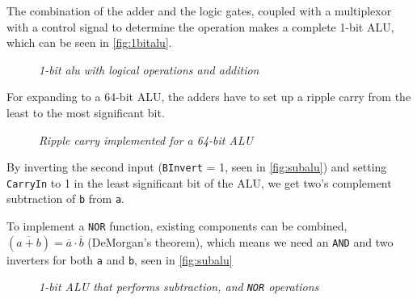 \documentclass[11pt]{article}
\begin{document}
The combination of the adder and the logic gates, coupled with a multiplexor with a control signal to determine the operation makes a complete 1-bit ALU, which can be seen in \autoref{fig:1bitalu}.
\pagebreak

\begin{figure}[htbp]
    \centering
    \caption{\textit{1-bit alu with logical operations and addition}}
    \label{fig:1bitalu}
\end{figure}

For expanding to a 64-bit ALU, the adders have to set up a ripple carry from the least to the most significant bit.

\begin{figure}[htbp]
    \centering
    \caption{\textit{Ripple carry implemented for a 64-bit ALU}}
\end{figure}

By inverting the second input (\texttt{BInvert} = 1, seen in \autoref{fig:subalu}) and setting \texttt{CarryIn} to 1 in the least significant bit of the ALU, we get two’s complement subtraction of \texttt{b} from \texttt{a}.

To implement a \texttt{NOR} function, existing components can be combined, $(\overline{a+b})=\overline{a} \cdot \overline{b}$ (DeMorgan's theorem), which means we need an \texttt{AND} and two inverters for both \texttt{a} and \texttt{b}, seen in \autoref{fig:subalu}

\begin{figure}[htbp]
    \centering
    \caption{\textit{1-bit ALU that performs subtraction, and \texttt{NOR} operations}}
    \label{fig:subalu}
\end{figure}
\end{document}
